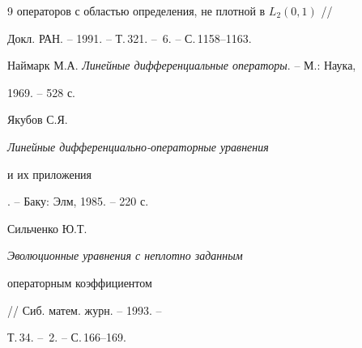 \begin{thebibliography}{9}
{операторов с областью определения, не плотной в $L_2(0,1)$} // 


Докл. РАН. -- 1991. -- Т.\,321. -- \No\,6. -- С.\,1158--1163. 




Наймарк М.А. {\em Линейные дифференциальные операторы}. -- М.: Наука, 


1969. -- 528 с. 




Якубов С.Я. {\em Линейные дифференциально-операторные уравнения  


и их приложения}. -- Баку: Элм, 1985. -- 220 с. 




Сильченко Ю.Т. {\em Эволюционные уравнения с неплотно заданным  


операторным коэффициентом} // Сиб. матем. журн. -- 1993. -- 


Т.\,34. -- \No\,2. -- С.\,166--169. 


 


\end{thebibliography} 


 


\vskip 2cm 


 








\label{end} 


 


